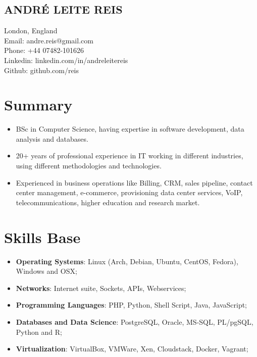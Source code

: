 \documentclass[margin]{res}
\begin{document}
  

\subsection{ANDRÉ LEITE REIS}
  London, England\\
  Email: andre.reis@gmail.com\\
  Phone: +44 07482-101626\\
  Linkedin: linkedin.com/in/andreleitereis\\
  Github: github.com/reis\\

\section{Summary}

\begin{itemize}

\item
  BSc in Computer Science, having expertise in software development,
  data analysis and databases.
\item
  20+ years of professional experience in IT working in different
  industries, using different methodologies and technologies.
\item
  Experienced in business operations like Billing, CRM, sales pipeline,
  contact center management, e-commerce, provisioning data center
  services, VoIP, telecommunications, higher education and research
  market.
\end{itemize}

\section{Skills Base}

\begin{itemize}

\item
  \textbf{Operating Systems}: Linux (Arch, Debian, Ubuntu, CentOS,
  Fedora), Windows and OSX;
\item
  \textbf{Networks}: Internet suite, Sockets, APIs, Webservices;
\item
  \textbf{Programming Languages}: PHP, Python, Shell Script, Java,
  JavaScript;
\item
  \textbf{Databases and Data Science}: PostgreSQL, Oracle, MS-SQL,
  PL/pgSQL, Python and R;
\item
  \textbf{Virtualization}: VirtualBox, VMWare, Xen, Cloudstack, Docker,
  Vagrant;
\end{itemize}
\end{document}
